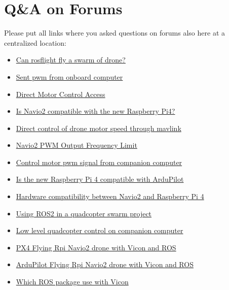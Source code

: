 \chapter{Q\&A on Forums}
Please put all links where you asked questions on forums also here at a centralized location:
\begin{itemize}
    \item \href{https://github.com/rosflight/rosflight/issues/100}{Can rosflight fly a swarm of drone?}
    \item \href{https://github.com/rosflight/rosflight/issues/98}{Sent pwm from onboard computer}
    \item \href{https://github.com/PX4/Firmware/pull/10863}{Direct Motor Control Access}
    \item \href{https://github.com/emlid/Navio2/issues/42}{Is Navio2 compatible with the new Raspberry Pi4?}
    \item \href{https://github.com/ArduPilot/ardupilot/issues/11859}{Direct control of drone motor speed through mavlink}
    \item \href{https://community.emlid.com/t/navio2-pwm-output-frequency-limit/1934}{Navio2 PWM Output Frequency Limit}
    \item \href{https://discuss.ardupilot.org/t/control-motor-pwm-signal-from-companion-computer/44634}{Control motor pwm signal from companion computer}
    \item \href{https://discuss.ardupilot.org/t/is-the-new-raspberry-pi-4-compatible-with-ardupilot/44956}{Is the new Raspberry Pi 4 compatible with ArduPilot}
    \item \href{https://community.emlid.com/t/hardware-compatibility-between-navio2-and-raspberry-pi-4/15344}{Hardware compatibility between Navio2 and Raspberry Pi 4}
    \item \href{https://discuss.px4.io/t/using-ros2-in-a-quadcopter-swarm-project/12055}{Using ROS2 in a quadcopter swarm project}
    \item \href{https://discuss.px4.io/t/low-level-quadcopter-control-on-companion-computer/12081}{Low level quadcopter control on companion computer}
    \item \href{https://discuss.px4.io/t/flying-rpi-navio2-drone-with-vicon-and-ros/12265}{PX4 Flying Rpi Navio2 drone with Vicon and ROS}
    \item \href{https://discuss.ardupilot.org/t/flying-rpi-navio2-drone-with-vicon-and-ros/45557}{ArduPilot Flying Rpi Navio2 drone with Vicon and ROS}
    \item \href{https://answers.ros.org/question/329849/which-ros-package-use-with-vicon/}{Which ROS package use with Vicon}
\end{itemize}
